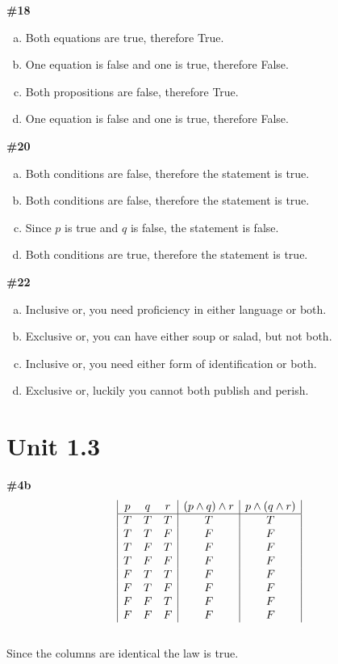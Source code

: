 \documentclass{article}
\newcommand{\unit}[1]{\section{Unit #1}}
\newcommand{\problem}[1]{\textbf{\##1}}
\begin{document}
\problem{18}
\begin{enumerate}[a)]
    \item Both equations are true, therefore True.
    \item One equation is false and one is true, therefore False.
    \item Both propositions are false, therefore True.
    \item One equation is false and one is true, therefore False.
\end{enumerate}
\pagebreak
\problem{20}
\begin{enumerate}[a)]
    \item Both conditions are false, therefore the statement is true.
    \item Both conditions are false, therefore the statement is true.
    \item Since \(p\) is true and \(q\) is false, the statement is false.
    \item Both conditions are true, therefore the statement is true.
\end{enumerate}
\problem{22}
\begin{enumerate}[a)]
    \item Inclusive or, you need proficiency in either language or both.
    \item Exclusive or, you can have either soup or salad, but not both.
    \item Inclusive or, you need either form of identification or both.
    \item Exclusive or, luckily you cannot both publish and perish.
\end{enumerate}
\pagebreak
\unit{1.3}
\problem{4b}
\begin{displaymath}
    \begin{array}{|c c c|c|c|}

    p & q & r & (p \wedge q)\wedge r & p \wedge(q \wedge r) \\
    \hline
    T & T & T & T           & T           \\
    T & T & F & F           & F           \\
    T & F & T & F           & F           \\
    T & F & F & F           & F           \\
    F & T & T & F           & F           \\
    F & T & F & F           & F           \\
    F & F & T & F           & F           \\
    F & F & F & F           & F          
    \end{array}
\end{displaymath}
\\
Since the columns are identical the law is true.
\end{document}
